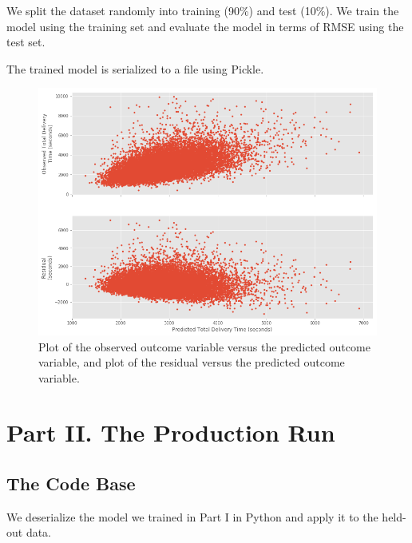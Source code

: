 \documentclass[12pt]{article}
\begin{document}
We split the dataset randomly into training (90\%) and test (10\%). We train the model using the training set and evaluate the model in terms of RMSE using the test set.

The trained model is serialized to a file using Pickle.


\begin{figure}[H]
\centering
\includegraphics[width=6in]{graphics/results.png}
\caption{Plot of the observed outcome variable versus the predicted outcome variable, and plot of the residual versus the predicted outcome variable.}
\label{fig:results01}
\end{figure}






\section{Part II. The Production Run}

\subsection{The Code Base}
We deserialize the model we trained in Part I in Python and apply it to the held-out data.
\end{document}
